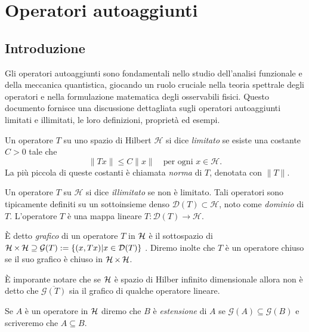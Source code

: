 \chapter{Operatori autoaggiunti}
\section{Introduzione}
Gli operatori autoaggiunti sono fondamentali nello studio dell'analisi funzionale e della meccanica quantistica, giocando un ruolo cruciale nella teoria spettrale degli operatori e nella formulazione matematica degli osservabili fisici. Questo documento fornisce una discussione dettagliata sugli operatori autoaggiunti limitati e illimitati, le loro definizioni, proprietà ed esempi.


\begin{definition}
Un operatore $T$ su uno spazio di Hilbert $\mathcal{H}$ si dice \emph{limitato} se esiste una costante $C > 0$ tale che
\[
\|T x\| \leq C \|x\| \quad \text{per ogni } x \in \mathcal{H}.
\]
La più piccola di queste costanti è chiamata \emph{norma} di $T$, denotata con $\|T\|$.
\end{definition}


\begin{definition}
Un operatore $T$ su $\mathcal{H}$ si dice \emph{illimitato} se non è limitato. Tali operatori sono tipicamente definiti su un sottoinsieme denso $\mathcal{D}(T) \subset \mathcal{H}$, noto come \emph{dominio} di $T$. L'operatore $T$ è una mappa lineare $T : \mathcal{D}(T) \to \mathcal{H}$.
\end{definition}



\begin{definition}
    È detto \emph{grafico} di un operatore $T$ in $ \operatorname{\mathcal{H}} $ è il sottospazio di $ \operatorname{\mathcal{H}} \times \operatorname{\mathcal{H}} \supseteq \mathcal{G}(T):= \{ (x, Tx) | x \in \mathcal{D}(T) \}$ . 
Diremo inolte che $T$ è un operatore chiuso se il suo grafico è chiuso in $\operatorname{\mathcal{H}} \times \operatorname{\mathcal{H}}$.
\end{definition}

È imporante notare che se $\operatorname{\mathcal{H}}$ è spazio di Hilber infinito dimensionale allora non è detto che $\overline{\mathcal{G}(T)}$ sia il grafico di qualche operatore lineare.

\begin{definition}
    Se $A$ è un operatore in $\operatorname{\mathcal{H}}$ diremo che $B$ è \emph{estensione} di $A$ se $\mathcal{G}(A) \subseteq \mathcal{G}(B) $ e scriveremo che $A \subseteq B$. 
\end{definition}

